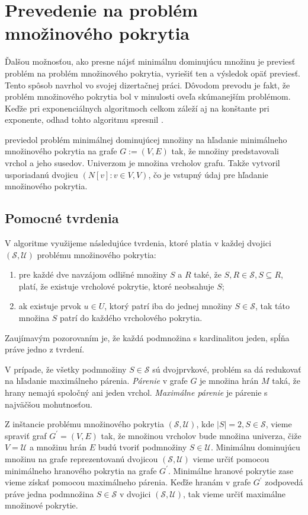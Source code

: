 \section{Prevedenie na problém množinového pokrytia}

Ďalšou možnosťou, ako presne nájsť minimálnu dominujúcu množinu je previesť 
problém na problém množinového pokrytia, vyriešiť ten a výsledok opäť previesť.
Tento spôsob navrhol \citet{grandoni04} vo svojej dizertačnej práci. Dôvodom 
prevodu je fakt, že problém množinového pokrytia bol v minulosti oveľa 
skúmanejším problémom.
Keďže pri exponenciálnych algoritmoch celkom záleží aj na konštante pri 
exponente, odhad tohto algoritmu spresnil \citet{fomin05}. 

\citet{grandoni04} previedol problém minimálnej dominujúcej množiny na 
hľadanie minimálneho množinového pokrytia na grafe $G := (V, E)$ tak, že 
množiny predstavovali vrchol a jeho susedov. Univerzom je množina vrcholov 
grafu. Takže vytvoril usporiadanú dvojicu $({N[v] : v \in V }, V)$, čo je 
vstupný údaj pre hľadanie množinového pokrytia.

\subsection{Pomocné tvrdenia}

V algoritme využijeme následujúce tvrdenia, ktoré platia v každej dvojici 
$(\mathcal{S}, \mathcal{U})$ problému množinového pokrytia:
\begin{enumerate}
	\item pre každé dve navzájom odlišné množiny $S$ a $R$ také, že 
		$S, R \in \mathcal{S}, S \subseteq R$, platí, že existuje vrcholové 
		pokrytie, ktoré neobsahuje $S$;
	\item ak existuje prvok $u \in U$, ktorý patrí iba do jednej množiny 
		$S \in \mathcal{S}$, tak táto množina $S$ patrí do každého vrcholového 
		pokrytia.
\end{enumerate}

Zaujímavým pozorovaním je, že každá podmnožina s kardinalitou jeden, spĺňa 
práve jedno z tvrdení.

V prípade, že všetky podmnožiny $S \in \mathcal{S}$ sú dvojprvkové, problém 
sa dá redukovať na hľadanie maximálneho párenia. \emph{Párenie} v grafe $G$ 
je množina hrán $M$ taká, že hrany nemajú spoločný ani jeden vrchol. 
\emph{Maximálne párenie} je párenie s najväčšou mohutnosťou.

Z inštancie problému množinového pokrytia $(\mathcal{S}, \mathcal{U})$, kde 
$|S| = 2, S \in \mathcal{S}$, vieme spraviť graf $G^\prime = (V, E)$ tak, 
že množinou vrcholov bude množina univerza, čiže $V = \mathcal{U}$ a množinu 
hrán $E$ budú tvoriť podmnožiny $S \in \mathcal{U}$. Minimálnu dominujúcu 
množinu na grafe reprezentovanú dvojicou $(\mathcal{S}, \mathcal{U})$ vieme 
určiť pomocou minimálneho hranového pokrytia na grafe $G^\prime$. 
Minimálne hranové pokrytie zase vieme získať pomocou maximálneho párenia. 
Keďže hranám v grafe $G^\prime$ zodpovedá práve jedna podmnožina 
$S \in \mathcal{S}$ v dvojici $(\mathcal{S}, \mathcal{U})$, tak vieme určiť 
maximálne množinové pokrytie.

